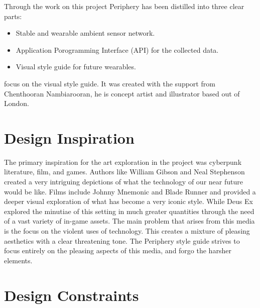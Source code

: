 
Through the work on this project Periphery has been distilled into three clear parts: 

\begin{itemize}
  \item Stable and wearable ambient sensor network.
  \item Application Porogramming Interface (API) for the collected data.
  \item Visual style guide for future wearables.
\end{itemize}

 focus on the visual style guide. It was created with the support from Chenthooran Nambiarooran, he is concept artist and illustrator based out of London.

\section{Design Inspiration}

The primary inspiration for the art exploration in the project was cyberpunk literature, film, and games. Authors like William Gibson and Neal Stephenson created a very intriguing depictions of what the technology of our near future would be like. Films include Johnny Mnemonic and Blade Runner and provided a deeper visual exploration of what has become a very iconic style. While Deus Ex explored the minutiae of this setting in much greater quantities through the need of a vast variety of in-game assets. The main problem that arises from this media is the focus on the violent uses of technology. This creates a mixture of pleasing aesthetics with a clear threatening tone. The Periphery style guide strives to focus entirely on the pleasing aspects of this media, and forgo the harsher elements.
\FloatBarrier

\section{Design Constraints}\label{sec:designconstraints}


